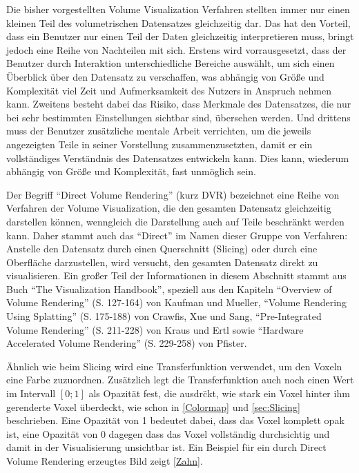 \documentclass[a4paper,fontsize=12pt,toc=bib,halfparskip,ngerman]{scrartcl}
\begin{document}
Die bisher vorgestellten Volume Visualization Verfahren stellten immer nur einen kleinen Teil des volumetrischen Datensatzes gleichzeitig dar. Das hat den Vorteil, dass ein Benutzer nur einen Teil der Daten gleichzeitig interpretieren muss, bringt jedoch eine Reihe von Nachteilen mit sich. Erstens wird vorrausgesetzt, dass der Benutzer durch Interaktion unterschiedliche Bereiche ausw\"ahlt, um sich einen \"Uberblick \"uber den Datensatz zu verschaffen, was abh\"angig von Gr\"o{\ss}e und Komplexit\"at viel Zeit und Aufmerksamkeit des Nutzers in Anspruch nehmen kann. Zweitens besteht dabei das Risiko, dass Merkmale des Datensatzes, die nur bei sehr bestimmten Einstellungen sichtbar sind, \"ubersehen werden. Und drittens muss der Benutzer zus\"atzliche mentale Arbeit verrichten, um die jeweils angezeigten Teile in seiner Vorstellung zusammenzusetzten, damit er ein vollst\"andiges Verst\"andnis des Datensatzes entwickeln kann. Dies kann, wiederum abh\"angig von Gr\"o{\ss}e und Komplexit\"at, fast unm\"oglich sein.

Der Begriff ``Direct Volume Rendering'' (kurz DVR) bezeichnet eine Reihe von Verfahren der Volume Visualization, die den gesamten Datensatz gleichzeitig darstellen k\"onnen, wenngleich die Darstellung auch auf Teile beschr\"ankt werden kann. Daher stammt auch das ``Direct'' im Namen dieser Gruppe von Verfahren: Anstelle den Datensatz durch einen Querschnitt (Slicing) oder durch eine Oberfl\"ache darzustellen, wird versucht, den gesamten Datensatz direkt zu visualisieren. Ein gro{\ss}er Teil der Informationen in diesem Abschnitt stammt aus Buch ``The Visualization Handbook''\cite{hansen2005visualization}, speziell aus den Kapiteln ``Overview of Volume Rendering'' (S. 127-164) von Kaufman und Mueller, ``Volume Rendering Using Splatting'' (S. 175-188) von Crawfis, Xue und Sang, ``Pre-Integrated Volume Rendering'' (S. 211-228) von Kraus und Ertl  sowie ``Hardware Accelerated Volume Rendering'' (S. 229-258) von Pfister.

\"Ahnlich wie beim Slicing wird eine Transferfunktion verwendet, um den Voxeln eine Farbe zuzuordnen. Zus\"atzlich legt die Transferfunktion auch noch einen Wert im Intervall $[0;1]$ als Opazit\"at fest, die ausdr\"ckt, wie stark ein Voxel hinter ihm gerenderte Voxel \"uberdeckt, wie schon in \cref{Colormap} und \cref{sec:Slicing} beschrieben. Eine Opazit\"at von 1 bedeutet dabei, dass das Voxel komplett opak ist, eine Opazit\"at von 0 dagegen dass das Voxel vollst\"andig durchsichtig und damit in der Visualisierung unsichtbar ist. Ein Beispiel f\"ur ein durch Direct Volume Rendering erzeugtes Bild zeigt \cref{Zahn}. 
\end{document}
